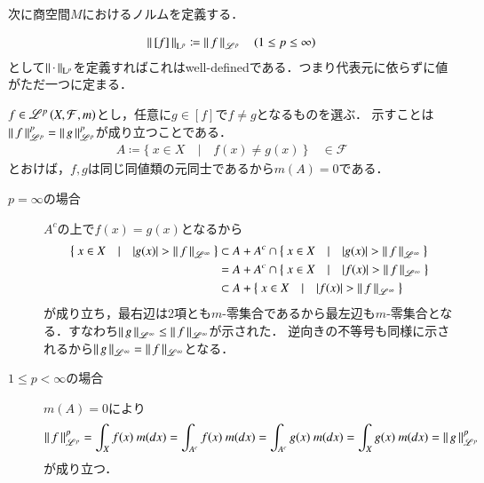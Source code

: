 \begin{qst}
次に商空間$M$におけるノルムを定義する．
\begin{lem}
	\begin{align}
		\left\|\, [f]\, \right\|_{\mathrm{L}^p} \coloneqq \left\|\, f\, \right\|_{\mathscr{L}^p} \quad (1 \leq p \leq \infty)
	\end{align}
	として$\left\|\, \cdot\, \right\|_{\mathrm{L}^p}$を定義すればこれはwell-definedである．つまり代表元に依らずに値がただ一つに定まる．
\end{lem}
\begin{prf}
	$f \in \mathscr{L}^{p} \left(X,\mathcal{F},m\right)$とし，任意に$g \in [f]$で$f \neq g$となるものを選ぶ．
	示すことは$\left\|\, f\, \right\|_{\mathscr{L}^p}^p = \left\|\, g\, \right\|_{\mathscr{L}^p}^p$が成り立つことである．
	\begin{align}
		A \coloneqq \{\ x \in X\quad |\quad f(x) \neq g(x)\ \} \quad \in \mathcal{F}
	\end{align}
	とおけば，$f,g$は同じ同値類の元同士であるから$m(A)=0$である．
	\begin{description}
		\item[$p = \infty$の場合]
			$A^c$の上で$f(x)=g(x)$となるから
			\begin{align}
				\left\{\ x \in X\quad |\quad |g(x)| > \left\|\, f\, \right\|_{\mathscr{L}^\infty}\ \right\} 
				&\subset A + A^c \cap \left\{\ x \in X\quad |\quad |g(x)| > \left\|\, f\, \right\|_{\mathscr{L}^\infty}\ \right\} \\
				&= A + A^c \cap \left\{\ x \in X\quad |\quad |f(x)| > \left\|\, f\, \right\|_{\mathscr{L}^\infty}\ \right\} \\
				&\subset A + \left\{\ x \in X\quad |\quad |f(x)| > \left\|\, f\, \right\|_{\mathscr{L}^\infty}\ \right\}
			\end{align}
			が成り立ち，最右辺は2項とも$m$-零集合であるから最左辺も$m$-零集合となる．すなわち$\left\|\, g\, \right\|_{\mathscr{L}^\infty} \leq \left\|\, f\, \right\|_{\mathscr{L}^\infty}$が示された．
			逆向きの不等号も同様に示されるから$\left\|\, g\, \right\|_{\mathscr{L}^\infty} = \left\|\, f\, \right\|_{\mathscr{L}^\infty}$となる．
		\item[$1 \leq p < \infty$の場合]
			$m(A)=0$により
			\begin{align}
				\left\|\, f\, \right\|_{\mathscr{L}^p}^p = \int_X f(x)\ m(dx) = \int_{A^c} f(x)\ m(dx) = \int_{A^c} g(x)\ m(dx) = \int_X g(x)\ m(dx) = \left\|\, g\, \right\|_{\mathscr{L}^p}^p
			\end{align}
			が成り立つ．
	\end{description}
	\QED
\end{prf}


\end{qst}
